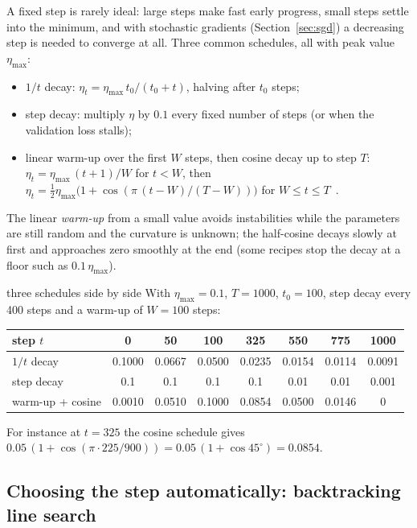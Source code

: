 \documentclass[11pt]{article}
\begin{document}
A fixed step is rarely ideal: large steps make fast early progress, small steps settle into the minimum, and with
stochastic gradients (Section~\ref{sec:sgd}) a decreasing step is needed to converge at all. Three common schedules,
all with peak value $\eta_{\max}$:
\begin{itemize}
\item $1/t$ decay: $\eta_t = \eta_{\max}\, t_0/(t_0 + t)$, halving after $t_0$ steps;
\item step decay: multiply $\eta$ by $0.1$ every fixed number of steps (or when the validation loss stalls);
\item linear warm-up over the first $W$ steps, then cosine decay up to step $T$: $\eta_t = \eta_{\max}\,(t + 1)/W$ for $t < W$, then
$\eta_t = \frac12\eta_{\max}\big(1 + \cos(\pi\,(t - W)/(T - W))\big)$ for $W \le t \le T$~\cite{loshchilov2017}.
\end{itemize}
The linear \emph{warm-up} from a small value avoids instabilities while the parameters are still random and the
curvature is unknown; the half-cosine decays slowly at first and approaches zero smoothly at the end (some recipes stop
the decay at a floor such as $0.1\,\eta_{\max}$).

\begin{worked}{three schedules side by side}
With $\eta_{\max} = 0.1$, $T = 1000$, $t_0 = 100$, step decay every 400 steps and a warm-up of $W = 100$ steps:
\begin{center}\small
\begin{tabular}{@{}lccccccc@{}}
\toprule
step $t$ & 0 & 50 & 100 & 325 & 550 & 775 & 1000 \\
\midrule
$1/t$ decay & 0.1000 & 0.0667 & 0.0500 & 0.0235 & 0.0154 & 0.0114 & 0.0091 \\
step decay  & 0.1 & 0.1 & 0.1 & 0.1 & 0.01 & 0.01 & 0.001 \\
warm-up + cosine & 0.0010 & 0.0510 & 0.1000 & 0.0854 & 0.0500 & 0.0146 & 0 \\
\bottomrule
\end{tabular}
\end{center}
For instance at $t = 325$ the cosine schedule gives $0.05\,(1 + \cos(\pi \cdot 225/900)) = 0.05\,(1 + \cos 45^\circ) = 0.0854$.
\end{worked}


\subsection{Choosing the step automatically: backtracking line search}\label{sec:linesearch}
\end{document}
